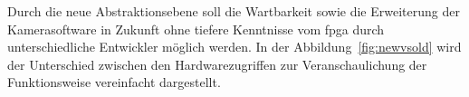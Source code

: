 Durch die neue Abstraktionsebene soll die Wartbarkeit sowie die Erweiterung der Kamerasoftware in Zukunft ohne tiefere Kenntnisse vom \ac{fpga} durch unterschiedliche Entwickler möglich werden. In der Abbildung~\ref{fig:newvsold} wird der Unterschied zwischen den Hardwarezugriffen zur Veranschaulichung der Funktionsweise vereinfacht dargestellt.









